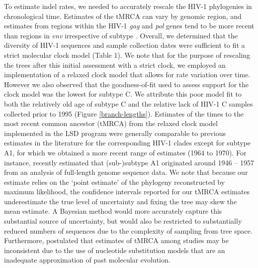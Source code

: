 \documentclass[12pt]{article}
\begin{document}
To estimate indel rates, we needed to accurately rescale the HIV-1 phylogenies in chronological time.
Estimates of the tMRCA can vary by genomic region, and estimates from regions within the HIV-1 \textit{gag} and \textit{pol} genes tend to be more recent than regions in \textit{env} irrespective of subtype \citep{olabode2018evidence}.
Overall, we determined that the diversity of HIV-1 sequences and sample collection dates were sufficient to fit a strict molecular clock model (Table 1).
We note that for the purpose of rescaling the trees after this initial assessment with a strict clock, we employed an implementation of a relaxed clock model that allows for rate variation over time.
However we also observed that the goodness-of-fit used to assess support for the clock model was the lowest for subtype C.
We attribute this poor model fit to both the relatively old age of subtype C \citep{Wertheim:2011} and the relative lack of HIV-1 C samples collected prior to 1995 (Figure \ref{branch-lengths}). 
Estimates of the times to the most recent common ancestor (tMRCA) from the relaxed clock model implemented in the LSD program were generally comparable to previous estimates in the literature for the corresponding HIV-1 clades \citep{Hemelaar:2012, Wertheim:2011} except for subtype A1, for which we obtained a more recent range of estimates (1964 to 1970).
For instance, \citet{tongo2018unravelling} recently estimated that (sub-)subtype A1 originated around 1946 -- 1957 from an analysis of full-length genome sequence data.
We note that because our estimate relies on the `point estimate' of the phylogeny reconstructed by maximum likelihood, the confidence intervals reported for our tMRCA estimates underestimate the true level of uncertainty and fixing the tree may skew the mean estimate.
A Bayesian method would more accurately capture this substantial source of uncertainty, but would also be restricted to substantially reduced numbers of sequences due to the complexity of sampling from tree space.
Furthermore, \citet{Wertheim:2011} postulated that estimates of tMRCA among studies may be inconsistent due to the use of nucleotide substitution models that are an  inadequate approximation of past molecular evolution.
\end{document}
